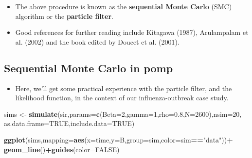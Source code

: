 \documentclass[]{article}
\newenvironment{Shaded}{\begin{snugshade}}{\end{snugshade}}
\newcommand{\KeywordTok}[1]{\textcolor[rgb]{0.13,0.29,0.53}{\textbf{#1}}}
\newcommand{\DataTypeTok}[1]{\textcolor[rgb]{0.13,0.29,0.53}{#1}}
\newcommand{\DecValTok}[1]{\textcolor[rgb]{0.00,0.00,0.81}{#1}}
\newcommand{\FloatTok}[1]{\textcolor[rgb]{0.00,0.00,0.81}{#1}}
\newcommand{\StringTok}[1]{\textcolor[rgb]{0.31,0.60,0.02}{#1}}
\newcommand{\OtherTok}[1]{\textcolor[rgb]{0.56,0.35,0.01}{#1}}
\newcommand{\OperatorTok}[1]{\textcolor[rgb]{0.81,0.36,0.00}{\textbf{#1}}}
\newcommand{\NormalTok}[1]{#1}
\providecommand{\tightlist}{%
  \setlength{\itemsep}{0pt}\setlength{\parskip}{0pt}}
\begin{document}
\begin{itemize}
\item
  The above procedure is known as the \textbf{sequential Monte Carlo}
  (SMC) algorithm or the \textbf{particle filter}.
\item
  Good references for further reading include Kitagawa (1987),
  Arulampalam et al. (2002) and the book edited by Doucet et al. (2001).
  
\end{itemize}

\subsection{\texorpdfstring{Sequential Monte Carlo in
\textbf{pomp}}{Sequential Monte Carlo in pomp}}\label{sequential-monte-carlo-in-pomp}

\begin{itemize}
\tightlist
\item
  Here, we'll get some practical experience with the particle filter,
  and the likelihood function, in the context of our influenza-outbreak
  case study.
\end{itemize}

\begin{Shaded}
\begin{Highlighting}[]
\NormalTok{sims <-}\StringTok{ }\KeywordTok{simulate}\NormalTok{(sir,}\DataTypeTok{params=}\KeywordTok{c}\NormalTok{(}\DataTypeTok{Beta=}\DecValTok{2}\NormalTok{,}\DataTypeTok{gamma=}\DecValTok{1}\NormalTok{,}\DataTypeTok{rho=}\FloatTok{0.8}\NormalTok{,}\DataTypeTok{N=}\DecValTok{2600}\NormalTok{),}\DataTypeTok{nsim=}\DecValTok{20}\NormalTok{,}
                 \DataTypeTok{as.data.frame=}\OtherTok{TRUE}\NormalTok{,}\DataTypeTok{include.data=}\OtherTok{TRUE}\NormalTok{)}

\KeywordTok{ggplot}\NormalTok{(sims,}\DataTypeTok{mapping=}\KeywordTok{aes}\NormalTok{(}\DataTypeTok{x=}\NormalTok{time,}\DataTypeTok{y=}\NormalTok{B,}\DataTypeTok{group=}\NormalTok{sim,}\DataTypeTok{color=}\NormalTok{sim}\OperatorTok{==}\StringTok{"data"}\NormalTok{))}\OperatorTok{+}
\StringTok{  }\KeywordTok{geom_line}\NormalTok{()}\OperatorTok{+}\KeywordTok{guides}\NormalTok{(}\DataTypeTok{color=}\OtherTok{FALSE}\NormalTok{)}
\end{Highlighting}
\end{Shaded}
\end{document}
